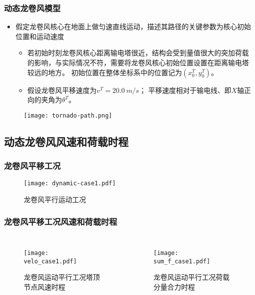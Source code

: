 \begin{frame}
  \frametitle{动态龙卷风模型}
  \begin{itemize}
  \item 
    假定龙卷风核心在地面上做匀速直线运动，描述其路径的关键参数为核心初始位置和运动速度
    \begin{itemize}
    \item
      若初始时刻龙卷风核心距离输电塔很近，结构会受到量值很大的突加荷载的影响，与实际情况不符，需要将龙卷风核心初始位置设置在距离输电塔较远的地方。
      初始位置在整体坐标系中的位置记为$\left(x^T_{0},y^T_{0}\right)$。
    \item
      假设龙卷风平移速度为$v^T=\SI{20.0}{m/s}$；
      平移速度相对于输电线、即$X$轴正向的夹角为$\theta^T$。
   
    \end{itemize}
  
  \end{itemize}

  \begin{figure}[!htpb]
    \centering
    \texttt{[image: tornado-path.png]}
    \label{fig:tornado-path}
  \end{figure}
\end{frame}

\subsection{动态龙卷风风速和荷载时程}

\begin{frame}
  \frametitle{龙卷风平移工况}
  \begin{figure}[!htpb]
    \centering
    \texttt{[image: dynamic-case1.pdf]}
    \caption*{龙卷风平行运动工况}
    \label{fig:dynamic-case1}
  \end{figure}
\end{frame}

\begin{frame}
  \frametitle{龙卷风平移工况风速和荷载时程}
  \begin{columns}
   \begin{figure}[!htpb]
     \centering
     \texttt{[image: velo\_case1.pdf]}
     \caption*{龙卷风运动平行工况塔顶节点风速时程}
     \label{fig:velo_case1}
   \end{figure}
   \begin{figure}[!htpb]
     \centering
     \texttt{[image: sum\_f\_case1.pdf]}
     \caption*{龙卷风运动平行工况荷载分量合力时程}
     \label{fig:sum_f_case1}
   \end{figure}
  \end{columns}
\end{frame}

